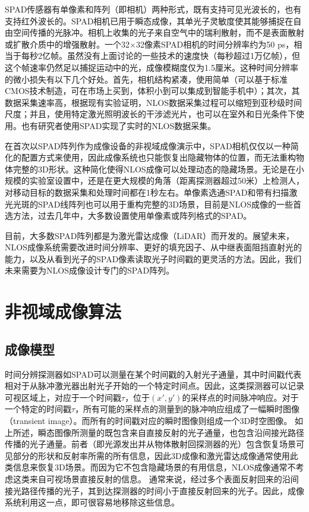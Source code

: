 \documentclass[master]{shtthesis}             %
\begin{document}
SPAD传感器有单像素和阵列（即相机）两种形式，既有支持可见光波长的\citep{richardson200932,richardson2011scaleable,gersbach2012time,bronzi2014100,burri2016linospad}，也有支持红外波长的\citep{itzler2008geiger,itzler2008single,itzler2007single}。SPAD相机已用于瞬态成像，其单光子灵敏度使其能够捕捉在自由空间传播的光脉冲。相机上收集的光子来自空气中的瑞利散射，而不是表面散射或扩散介质中的增强散射\citep{gariepy2015single}。一个32$\times$32像素SPAD相机的时间分辨率约为50 ps，相当于每秒2亿帧。虽然没有上面讨论的一些技术的速度快（每秒超过1万亿帧），但这个帧速率仍然足以捕捉运动中的光，成像模糊度仅为1.5厘米。这种时间分辨率的微小损失有以下几个好处。首先，相机结构紧凑，使用简单（可以基于标准CMOS技术制造，可在市场上买到，体积小到可以集成到智能手机中）；其次，其数据采集速率高，根据现有实验证明，NLOS数据采集过程可以缩短到亚秒级时间尺度\citep{musarra2019non}；并且，使用特定激光照明波长的干涉滤光片，也可以在室外和日光条件下使用\citep{Otoole2018,chan2017non}。也有研究者使用SPAD实现了实时的NLOS数据采集\citep{lindell2018towards}。

在首次以SPAD阵列作为成像设备的非视域成像演示中，SPAD相机仅仅以一种简化的配置方式来使用，因此成像系统也只能恢复出隐藏物体的位置，而无法重构物体完整的3D形状\citep{chan2017non}。这种简化使得NLOS成像可以处理动态的隐藏场景。无论是在小规模的实验室设置中，还是在更大规模的角落（距离探测器超过50米）上检测人\citep{gariepy2016detection}，对移动目标的数据采集和处理时间都在1秒左右。单像素选通SPAD\citep{buttafava2015non}和带有扫描激光光斑的SPAD线阵列\citep{o2017reconstructing}也可以用于重构完整的3D场景，目前是NLOS成像的一些首选方法，过去几年中，大多数设置使用单像素或阵列格式的SPAD。

目前，大多数SPAD阵列都是为激光雷达成像（LiDAR）而开发的。展望未来，NLOS成像系统需要改进时间分辨率、更好的填充因子、从中继表面阻挡直射光的能力，以及从看到光子的SPAD像素读取光子时间戳的更灵活的方法。因此，我们未来需要为NLOS成像设计专门的SPAD阵列。

\section{非视域成像算法}\label{sec:img_algo}

\subsection{成像模型}

时间分辨探测器如SPAD可以测量在某个时间戳的入射光子通量，其中时间戳代表相对于从脉冲激光器出射光子开始的一个特定时间点。因此，这类探测器可以记录可视区域上，对应于一个时间戳$\tau$，位于$(x',y')$的采样点的时间脉冲响应。对于一个特定的时间戳$\tau$，所有可能的采样点的测量到的脉冲响应组成了一幅瞬时图像（transient image）。而所有的时间戳对应的瞬时图像则组成一个3D时空图像。
如上所述，瞬态图像所测量的既包含来自直接反射的光子通量，也包含沿间接光路径传播的光子通量。前者（即光源发出并从物体散射回探测器的光）包含恢复场景可见部分的形状和反射率所需的所有信息，因此3D成像和激光雷达成像通常使用此类信息来恢复3D场景。而因为它不包含隐藏场景的有用信息，NLOS成像通常不考虑这类来自可视场景直接反射的信息。
通常来说，经过多个表面反射回来的沿间接光路径传播的光子，其到达探测器的时间小于直接反射回来的光子。因此，成像系统利用这一点，即可很容易地移除这些信息。
\end{document}
